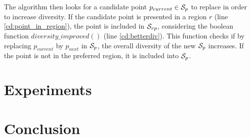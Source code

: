 \documentclass[runningheads,a4paper]{llncs}
\begin{document}
The algorithm then looks for a candidate point $p_{current} \in {\cal S}_p$ to replace in order to increase diversity. If the candidate point is presented in a region $r$ (line \ref{cd:point_in_region}), the point is included in ${\cal S}_{rp}$, considering the boolean function $\mathit{diversity\_improved}()$ (line \ref{cd:betterdiv}). This function checks if by replacing $p_{current}$ by $p_{next}$ in ${\cal S}_p$, the overall diversity of the new ${\cal S}_p$ increases. If the point is not in the preferred region, it is included into ${\cal S}_p$.

\section{Experiments}
\label{sec:experiments}


\section{Conclusion}
\label{sec:conclusions}





\vspace{-5pt}



\end{document}
